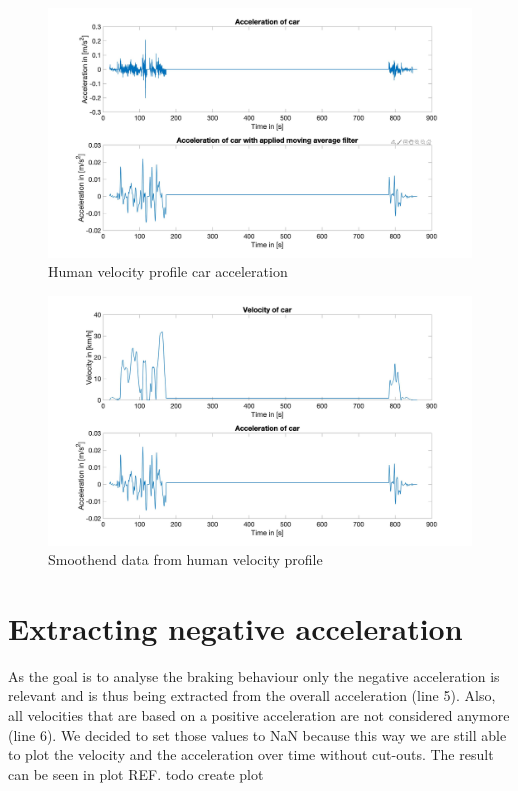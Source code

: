 \begin{figure}[H]
\centering
\includegraphics[width=1\textwidth]{images/D3_moving_average.jpg}
\caption{Human velocity profile car acceleration}
\label{fig:D3_MovingAverage}
\end{figure}

\begin{figure}[H]
\centering
\includegraphics[width=1\textwidth]{images/D3_Fig_Overview.jpg}
\caption{Smoothend data from human velocity profile}
\label{fig:D3_Fig_Overview}
\end{figure}


\section{Extracting negative acceleration}
As the goal is to analyse the braking behaviour only the negative acceleration is relevant and is thus being extracted from the overall acceleration (line 5). Also, all velocities that are based on a positive acceleration are not considered anymore (line 6). We decided to set those values to \ac{NaN} because this way we are still able to plot the velocity and the acceleration over time without cut-outs. The result can be seen in plot REF. todo create plot

